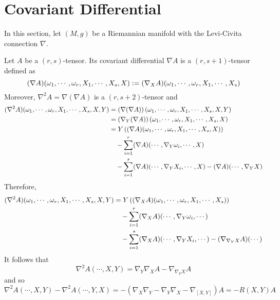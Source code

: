 \section{Covariant Differential}
In this section, let $(M,g)$ be a Riemannian manifold with the Levi-Civita connection $\nabla$. 

\noindent Let $A$ be a $(r,s)$-tensor. Its covariant differential $\nabla A$ is a $(r,s+1)$-tensor defined as
\begin{equation*}
	(\nabla A)(\omega_1,\cdots,\omega_r,X_1,\cdots,X_s,X) \vcentcolon= (\nabla_XA)(\omega_1,\cdots,\omega_r,X_1,\cdots,X_s)
\end{equation*}
Moreover, $\nabla^2 A = \nabla (\nabla A)$ is a $(r,s+2)$-tensor and
\begin{equation*}
	\begin{aligned}
		(\nabla^2 A)(\omega_1,\cdots,\omega_r,X_1,\cdots,X_s,X,Y) &=  \left(\nabla (\nabla A)\right)(\omega_1,\cdots,\omega_r,X_1,\cdots,X_s,X,Y)\\
		&= \left(\nabla_Y(\nabla A)\right)(\omega_1,\cdots,\omega_r,X_1,\cdots,X_s,X)\\
		&= Y\left((\nabla A)(\omega_1,\cdots,\omega_r,X_1,\cdots,X_s,X)\right) \\
		&\quad - \sum_{i=1}^r(\nabla A)(\cdots,\nabla_Y \omega_i,\cdots,X)\\
		&\quad - \sum_{i=1}^s(\nabla A)(\cdots,\nabla_Y X_i,\cdots,X) - (\nabla A)(\cdots,\nabla_Y X)
	\end{aligned}
\end{equation*}
Therefore,
\begin{equation*}
	\begin{aligned}
		(\nabla^2 A)(\omega_1,\cdots,\omega_r,X_1,\cdots,X_s,X,Y) &= Y\left((\nabla_X A)(\omega_1,\cdots,\omega_r,X_1,\cdots,X_s)\right) \\
		&\quad -\sum_{i=1}^r(\nabla_X A)(\cdots,\nabla_Y \omega_i,\cdots) \\
		&\quad - \sum_{i=1}^s(\nabla_X A)(\cdots,\nabla_Y X_i,\cdots) - (\nabla_{\nabla_Y X} A)(\cdots)
	\end{aligned}
\end{equation*}
It follows that
\begin{equation*}
	\nabla^2 A (\cdots,X,Y) = \nabla_Y\nabla_X A - \nabla_{\nabla_Y X} A
\end{equation*}
and so
\begin{equation*}
	\nabla^2 A (\cdots,X,Y) - \nabla^2 A (\cdots,Y,X) = -(\nabla_X\nabla_Y - \nabla_Y\nabla_X - \nabla_{[X,Y]})A = -R(X,Y)A
\end{equation*}
